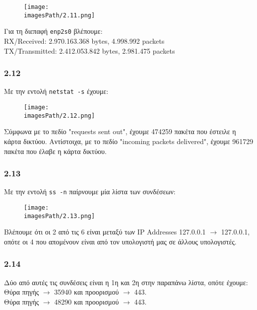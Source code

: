 			\begin{figure}[H]
				\texttt{[image: \\imagesPath/2.11.png]}
			\end{figure}
		
			Για τη διεπαφή \verb|enp2s0| βλέπουμε: \\
			RX/Received: 2.970.163.368 bytes, 4.998.992 packets \\
			TX/Transmitted: 2.412.053.842 bytes, 2.981.475 packets \\
		
		\subsubsection*{2.12}
		
			Με την εντολή \verb|netstat -s| έχουμε:
			
			\begin{figure}[H]
				\texttt{[image: \\imagesPath/2.12.png]}
			\end{figure}
			
			Σύμφωνα με το πεδίο "requests sent out", έχουμε 474259 πακέτα που έστειλε η κάρτα δικτύου. Αντίστοιχα, με το πεδίο "incoming packets delivered", έχουμε 961729 πακέτα που έλαβε η κάρτα δικτύου.
				
		\subsubsection*{2.13}
		
			Με την εντολή \verb|ss -n| παίρνουμε μία λίστα των συνδέσεων:
					
			\begin{figure}[H]
				\texttt{[image: \\imagesPath/2.13.png]}
			\end{figure}
		
			Βλέπουμε ότι οι 2 από τις 6 είναι μεταξύ των IP Addresses 127.0.0.1 $\rightarrow$ 127.0.0.1, οπότε οι 4 που απομένουν είναι από τον υπολογιστή μας σε άλλους υπολογιστές.
			
		\subsubsection*{2.14} 
		
			Δύο από αυτές τις συνδέσεις είναι η 1η και 2η στην παραπάνω λίστα, οπότε έχουμε: \\
			Θύρα πηγής $\rightarrow$ 35940 και προορισμού $\rightarrow$ 443. \\
			Θύρα πηγής $\rightarrow$ 48290 και προορισμού $\rightarrow$ 443. \\

